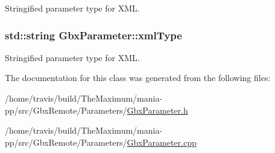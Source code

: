 Stringified parameter type for X\-M\-L. 

\hypertarget{classGbxParameter_ad5182c3df0c77e011c61e00e182f8a49}{
\subsubsection[{xml\-Type}]{\setlength{\rightskip}{0pt plus 5cm}std\-::string Gbx\-Parameter\-::xml\-Type\hspace{0.3cm}{\ttfamily [private]}}}\label{classGbxParameter_ad5182c3df0c77e011c61e00e182f8a49}


Stringified parameter type for X\-M\-L. 



The documentation for this class was generated from the following files\-:\begin{DoxyCompactItemize}
\item 
/home/travis/build/\-The\-Maximum/mania-\/pp/src/\-Gbx\-Remote/\-Parameters/\hyperlink{GbxParameter_8h}{Gbx\-Parameter.\-h}\item 
/home/travis/build/\-The\-Maximum/mania-\/pp/src/\-Gbx\-Remote/\-Parameters/\hyperlink{GbxParameter_8cpp}{Gbx\-Parameter.\-cpp}\end{DoxyCompactItemize}
